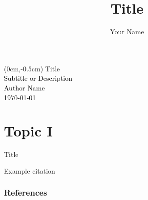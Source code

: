 \documentclass[aspectratio=169]{beamer}
\title{Title}
\author{Your Name}
\institute[Tohoku University]{Tohoku University} %
\begin{document}
{
\begin{frame}

\begin{textblock*}{12cm}(0cm,-0.5cm) %
    \textcolor{tupurple}{\Large Title} \\[0.5cm]
    \textcolor{black}{Subtitle or Description}\\[2cm]
    \textcolor{black}{\footnotesize Author Name \\ \today}
\end{textblock*}
\end{frame}
}


\section{Topic I}

\begin{frame}{Title}

Example citation \cite{bischl2015}

\end{frame}


\begin{frame}[allowframebreaks]
        \frametitle{References}
        
        
\end{frame}
\end{document}
